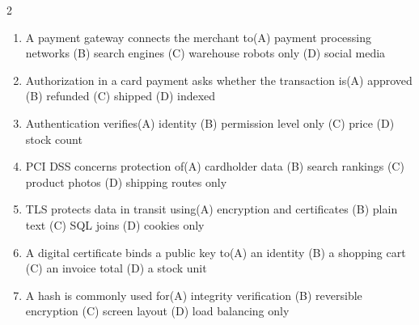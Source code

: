 \documentclass[a4paper]{article}
\begin{document}
\begin{multicols*}{2}
\begin{enumerate}
\item A payment gateway connects the merchant to\newline\hspace*{0.6em}(A) payment processing networks \quad (B) search engines \newline\hspace*{0.6em}(C) warehouse robots only \quad (D) social media
\item Authorization in a card payment asks whether the transaction is\newline\hspace*{0.6em}(A) approved \quad (B) refunded \newline\hspace*{0.6em}(C) shipped \quad (D) indexed
\item Authentication verifies\newline\hspace*{0.6em}(A) identity \quad (B) permission level only \newline\hspace*{0.6em}(C) price \quad (D) stock count
\item PCI DSS concerns protection of\newline\hspace*{0.6em}(A) cardholder data \quad (B) search rankings \newline\hspace*{0.6em}(C) product photos \quad (D) shipping routes only
\item TLS protects data in transit using\newline\hspace*{0.6em}(A) encryption and certificates \quad (B) plain text \newline\hspace*{0.6em}(C) SQL joins \quad (D) cookies only
\item A digital certificate binds a public key to\newline\hspace*{0.6em}(A) an identity \quad (B) a shopping cart \newline\hspace*{0.6em}(C) an invoice total \quad (D) a stock unit
\item A hash is commonly used for\newline\hspace*{0.6em}(A) integrity verification \quad (B) reversible encryption \newline\hspace*{0.6em}(C) screen layout \quad (D) load balancing only

\end{enumerate}
\end{multicols*}
\end{document}
